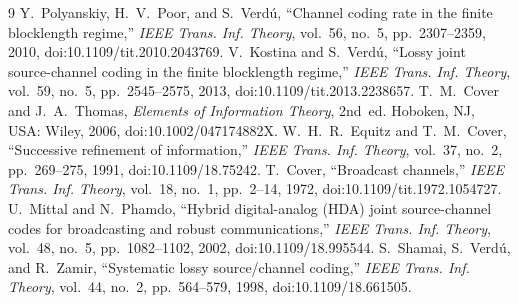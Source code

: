 \documentclass[11pt]{article}
\theoremstyle{definition}
\theoremstyle{remark}
\begin{document}
\begin{thebibliography}{9}
 Y.~Polyanskiy, H.~V.~Poor, and S.~Verd\'u, ``Channel coding rate in the finite blocklength regime,'' \emph{IEEE Trans. Inf. Theory}, vol.~56, no.~5, pp.~2307--2359, 2010, doi:10.1109/tit.2010.2043769.
 V.~Kostina and S.~Verd\'u, ``Lossy joint source-channel coding in the finite blocklength regime,'' \emph{IEEE Trans. Inf. Theory}, vol.~59, no.~5, pp.~2545--2575, 2013, doi:10.1109/tit.2013.2238657.
 T.~M.~Cover and J.~A.~Thomas, \emph{Elements of Information Theory}, 2nd~ed. Hoboken, NJ, USA: Wiley, 2006, doi:10.1002/047174882X.
 W.~H.~R.~Equitz and T.~M.~Cover, ``Successive refinement of information,'' \emph{IEEE Trans. Inf. Theory}, vol.~37, no.~2, pp.~269--275, 1991, doi:10.1109/18.75242.
 T.~Cover, ``Broadcast channels,'' \emph{IEEE Trans. Inf. Theory}, vol.~18, no.~1, pp.~2--14, 1972, doi:10.1109/tit.1972.1054727.
 U.~Mittal and N.~Phamdo, ``Hybrid digital-analog (HDA) joint source-channel codes for broadcasting and robust communications,'' \emph{IEEE Trans. Inf. Theory}, vol.~48, no.~5, pp.~1082--1102, 2002, doi:10.1109/18.995544.
 S.~Shamai, S.~Verd\'u, and R.~Zamir, ``Systematic lossy source/channel coding,'' \emph{IEEE Trans. Inf. Theory}, vol.~44, no.~2, pp.~564--579, 1998, doi:10.1109/18.661505.
\end{thebibliography}
\end{document}
